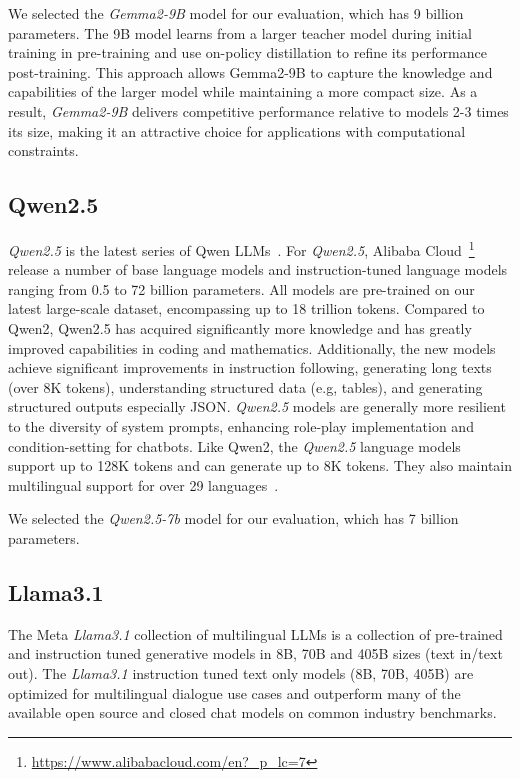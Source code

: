 We selected the \textit{Gemma2-9B} model for our evaluation, which has 9 billion parameters.
The 9B model learns from a larger teacher model during initial training in pre-training and use on-policy distillation to refine its performance post-training.
This approach allows Gemma2-9B to capture the knowledge and capabilities of the larger model while maintaining a more compact size.
As a result, \textit{Gemma2-9B} delivers competitive performance relative to models 2-3 times its size, making it an attractive choice for applications with computational constraints.

\subsection{Qwen2.5}\label{subsec:empirical-evaluation:candidate-models:qwen2.5}
\textit{Qwen2.5} is the latest series of Qwen LLMs~\cite{qwen2}.
For \textit{Qwen2.5}, Alibaba Cloud~\footnote{\url{https://www.alibabacloud.com/en?_p_lc=7}} release a number of base language models and instruction-tuned language models ranging from 0.5 to 72 billion parameters.
All models are pre-trained on our latest large-scale dataset, encompassing up to 18 trillion tokens.
Compared to Qwen2, Qwen2.5 has acquired significantly more knowledge and has greatly improved capabilities in coding and mathematics.
Additionally, the new models achieve significant improvements in instruction following, generating long texts (over 8K tokens), understanding structured data (e.g, tables), and generating structured outputs especially JSON.
\textit{Qwen2.5} models are generally more resilient to the diversity of system prompts, enhancing role-play implementation and condition-setting for chatbots.
Like Qwen2, the \textit{Qwen2.5} language models support up to 128K tokens and can generate up to 8K tokens.
They also maintain multilingual support for over 29 languages~\cite{qwen2.5}.

We selected the \textit{Qwen2.5-7b} model for our evaluation, which has 7 billion parameters.

\subsection{Llama3.1}\label{subsec:empirical-evaluation:candidate-models:llama3.1}
The Meta \textit{Llama3.1} collection of multilingual LLMs is a collection of pre-trained and instruction tuned generative models in 8B, 70B and 405B sizes (text in/text out).
The \textit{Llama3.1} instruction tuned text only models (8B, 70B, 405B) are optimized for multilingual dialogue use cases and outperform many of the available open source and closed chat models on common industry benchmarks.


